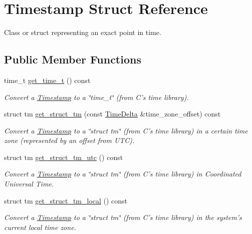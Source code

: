 \hypertarget{structTimestamp}{\section{Timestamp Struct Reference}
\label{structTimestamp}
}


Class or struct representing an exact point in time.  


\subsection*{Public Member Functions}
\begin{DoxyCompactItemize}
\item 
time\-\_\-t \hyperlink{structTimestamp_a54782bcc812fdeea952ec0e0880aac5f}{get\-\_\-time\-\_\-t} () const 
\begin{DoxyCompactList}\small\item\em Convert a \hyperlink{structTimestamp}{Timestamp} to a \char`\"{}time\-\_\-t\char`\"{} (from C's time library). \end{DoxyCompactList}\item 
struct tm \hyperlink{structTimestamp_a5f0b37829763c7c3c61ede13f23fcaa7}{get\-\_\-struct\-\_\-tm} (const \hyperlink{structTimeDelta}{Time\-Delta} \&time\-\_\-zone\-\_\-offset) const 
\begin{DoxyCompactList}\small\item\em Convert a \hyperlink{structTimestamp}{Timestamp} to a \char`\"{}struct tm\char`\"{} (from C's time library) in a certain time zone (represented by an offset from U\-T\-C). \end{DoxyCompactList}\item 
struct tm \hyperlink{structTimestamp_a763f8ab757e5d6cfb45c7931f75c5654}{get\-\_\-struct\-\_\-tm\-\_\-utc} () const 
\begin{DoxyCompactList}\small\item\em Convert a \hyperlink{structTimestamp}{Timestamp} to a \char`\"{}struct tm\char`\"{} (from C's time library) in Coordinated Universal Time. \end{DoxyCompactList}\item 
struct tm \hyperlink{structTimestamp_abc2107430b61e373e5ff84d16c1a097a}{get\-\_\-struct\-\_\-tm\-\_\-local} () const 
\begin{DoxyCompactList}\small\item\em Convert a \hyperlink{structTimestamp}{Timestamp} to a \char`\"{}struct tm\char`\"{} (from C's time library) in the system's current local time zone. \end{DoxyCompactList}\item 

\end{DoxyCompactItemize}
